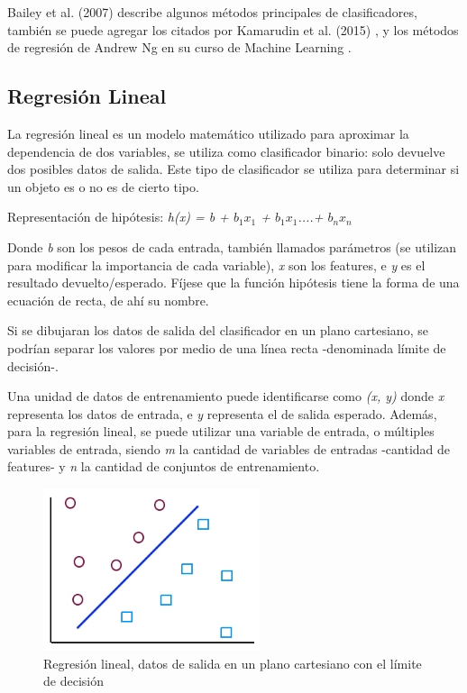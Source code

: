 \documentclass[a4paper,12pt,oneside,spanish]{book}
\begin{document}
Bailey et al. (2007) \cite{bailey} describe algunos métodos principales de clasificadores, también se puede agregar los citados por Kamarudin et al. (2015) \cite{kamarudin}, y los métodos de regresión de Andrew Ng en su curso de Machine Learning \cite{machinelearningcoursera}. \par

\subsection{Regresión Lineal}

La regresión lineal es un modelo matemático utilizado para aproximar la dependencia de dos variables, se utiliza como clasificador binario: solo devuelve dos posibles datos de salida. Este tipo de clasificador se utiliza para determinar si un objeto es o no es de cierto tipo. \par
Representación de hipótesis: \textit{h(x) = b + $b_1$$x_1$ + $b_1$$x_1$....+ $b_n$$x_n$}
	
Donde \textit{b} son los pesos de cada entrada, también llamados parámetros (se utilizan para modificar la importancia de cada variable), \textit{x} son los features, e \textit{y} es el resultado devuelto/esperado. Fíjese que la función hipótesis tiene la forma de una ecuación de recta, de ahí su nombre. \par


Si se dibujaran los datos de salida del clasificador en un plano cartesiano, se podrían separar los valores por medio de una línea recta -denominada límite de decisión-. \par

Una unidad de datos de entrenamiento puede identificarse como \textit{(x, y)} donde \textit{x} representa los datos de entrada, e \textit{y} representa el de salida esperado. Además, para la regresión lineal, se puede utilizar una variable de entrada, o múltiples variables de entrada, siendo \textit{m} la cantidad de variables de entradas -cantidad de features- y \textit{n} la cantidad de conjuntos de entrenamiento.  \par

\begin{figure}[h!]
	\includegraphics[width=180pt]{Imagenes/regresion1.jpg}
	\centering
	\caption{Regresión lineal, datos de salida en un plano cartesiano con el límite de decisión}
	\label{fig:regresion1}
\end{figure}
\end{document}

